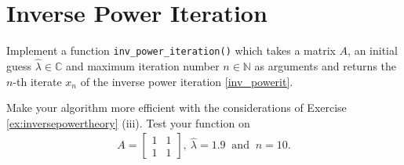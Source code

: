 \section{Inverse Power Iteration}
Implement a function \verb|inv_power_iteration()| which takes a matrix $A$, an initial guess $\hat{\lambda} \in \mathbb{C}$ and maximum iteration number  $n \in \mathbb{N}$ as arguments
	and returns the $n$-th iterate $x_n$ of the inverse power iteration \eqref{inv_powerit}.
	
	Make your algorithm more efficient with the considerations of Exercise \ref{ex:inversepowertheory} (iii).
	Test your function on
	\begin{align*}
		A = \begin{bmatrix}
			1&1\\
			1&1
		\end{bmatrix},~ \hat{\lambda} = 1.9  ~\textrm{ and }~ n = 10.
	\end{align*}